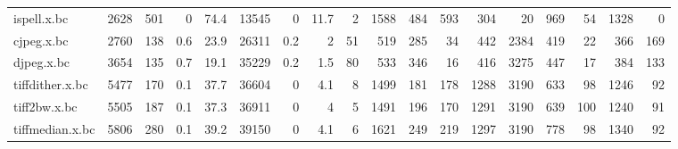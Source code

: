 \begin{tabular}{lrrrrrrrrrrrrrrrrr}
 ispell.x.bc          &     2628 &  501 &    0   &     74.4 &   13545 &    0   &     11.7 &     2 &    1588 &  484 &   593 &   304 &    20 &   969 &     54 &      1328 &       0 \\
 cjpeg.x.bc           &     2760 &  138 &    0.6 &     23.9 &   26311 &    0.2 &      2   &    51 &     519 &  285 &    34 &   442 &  2384 &   419 &     22 &       366 &     169 \\
 djpeg.x.bc           &     3654 &  135 &    0.7 &     19.1 &   35229 &    0.2 &      1.5 &    80 &     533 &  346 &    16 &   416 &  3275 &   447 &     17 &       384 &     133 \\
 tiffdither.x.bc      &     5477 &  170 &    0.1 &     37.7 &   36604 &    0   &      4.1 &     8 &    1499 &  181 &   178 &  1288 &  3190 &   633 &     98 &      1246 &      92 \\
 tiff2bw.x.bc         &     5505 &  187 &    0.1 &     37.3 &   36911 &    0   &      4   &     5 &    1491 &  196 &   170 &  1291 &  3190 &   639 &    100 &      1240 &      91 \\
 tiffmedian.x.bc      &     5806 &  280 &    0.1 &     39.2 &   39150 &    0   &      4.1 &     6 &    1621 &  249 &   219 &  1297 &  3190 &   778 &     98 &      1340 &      92 \\
\hline
\end{tabular}